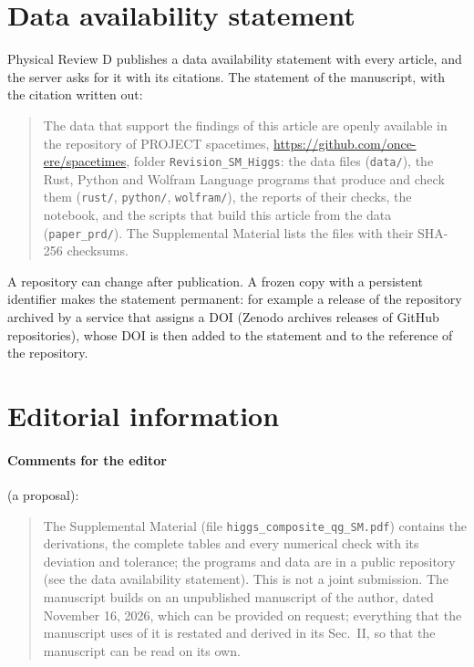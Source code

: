 \documentclass[11pt]{article}
\begin{document}
\section{Data availability statement}
\label{sec:das}

Physical Review D publishes a data availability statement with every article, and the server asks for it with its
citations. The statement of the manuscript, with the citation written out:

\begin{quote}
The data that support the findings of this article are openly available in the repository of PROJECT spacetimes,
\url{https://github.com/once-ere/spacetimes}, folder \texttt{Revision\_SM\_Higgs}: the data files (\texttt{data/}), the
Rust, Python and Wolfram Language programs that produce and check them (\texttt{rust/}, \texttt{python/},
\texttt{wolfram/}), the reports of their checks, the notebook, and the scripts that build this article from the data
(\texttt{paper\_prd/}). The Supplemental Material lists the files with their SHA-256 checksums.
\end{quote}

A repository can change after publication. A frozen copy with a persistent identifier makes the statement permanent: for
example a release of the repository archived by a service that assigns a DOI (Zenodo archives releases of GitHub
repositories), whose DOI is then added to the statement and to the reference of the repository.

\section{Editorial information}
\label{sec:editorial}

\paragraph{Comments for the editor} (a proposal):
\begin{quote}
The Supplemental Material (file \texttt{higgs\_composite\_qg\_SM.pdf}) contains the derivations, the complete tables and
every numerical check with its deviation and tolerance; the programs and data are in a public repository (see the data
availability statement). This is not a joint submission. The manuscript builds on an unpublished manuscript of the author,
dated November 16, 2026, which can be provided on request; everything that the manuscript uses of it is restated and
derived in its Sec.~II, so that the manuscript can be read on its own.
\end{quote}
\end{document}

